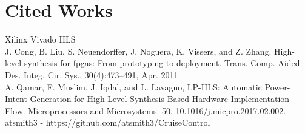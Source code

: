\documentclass[letterpaper, 10 pt, conference]{IEEEconf}  %
\begin{document}
\section{Cited Works}
\noindent [1] Xilinx Vivado HLS \\
\noindent [2] J. Cong, B. Liu, S. Neuendorffer, J. Noguera, K. Vissers, and
Z. Zhang. High-level synthesis for fpgas: From prototyping
to deployment. Trans. Comp.-Aided Des. Integ. Cir. Sys.,
30(4):473–491, Apr. 2011.\\
\noindent [3] A. Qamar, F. Muslim, J. Iqdal, and L. Lavagno, LP-HLS: Automatic Power-Intent Generation for High-Level Synthesis Based Hardware Implementation Flow. Microprocessors and Microsystems. 50. 10.1016/j.micpro.2017.02.002.  \\
\noindent [4] atsmith3 - https://github.com/atsmith3/CruiseControl
\end{document}
